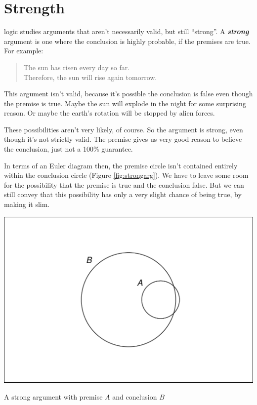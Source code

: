 \documentclass[justified]{tufte-book}
\newenvironment{argument}{\begin{quote}\normalsize}{\end{quote}}
\theoremstyle{definition}
\theoremstyle{definition}
\theoremstyle{definition}
\theoremstyle{remark}
\begin{document}
\hypertarget{strength}{%
\section{Strength}\label{strength}}

 logic studies arguments that aren't necessarily valid, but still ``strong''. A \textbf{\emph{strong}} argument is one where the conclusion is highly probable, if the premises are true. For example:

\begin{argument}
The sun has risen every day so far.\\
Therefore, the sun will rise again tomorrow.
\end{argument}

This argument isn't valid, because it's possible the conclusion is false even though the premise is true. Maybe the sun will explode in the night for some surprising reason. Or maybe the earth's rotation will be stopped by alien forces.

These possibilities aren't very likely, of course. So the argument is strong, even though it's not strictly valid. The premise gives us very good reason to believe the conclusion, just not a 100\% guarantee.

In terms of an Euler diagram then, the premise circle isn't contained entirely within the conclusion circle (Figure \ref{fig:strongarg}). We have to leave some room for the possibility that the premise is true and the conclusion false. But we can still convey that this possibility has only a very slight chance of being true, by making it slim.

\begin{marginfigure}
\includegraphics{_main_files/figure-latex/strongarg-1} \caption[A strong argument with premise $A$ and conclusion $B$]{A strong argument with premise $A$ and conclusion $B$}\label{fig:strongarg}
\end{marginfigure}
\end{document}

